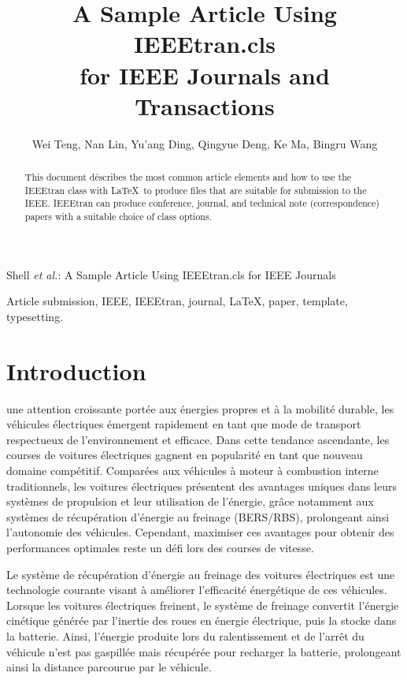 \documentclass[lettersize,journal]{IEEEtran}
\begin{document}
\title{A Sample Article Using IEEEtran.cls\\ for IEEE Journals and Transactions}

\author{Wei Teng, Nan Lin, Yu'ang Ding, Qingyue Deng, Ke Ma, Bingru Wang}

%
{Shell \MakeLowercase{\textit{et al.}}: A Sample Article Using IEEEtran.cls for IEEE Journals}

\IEEEpubid{}

\maketitle

\begin{abstract}
This document déscribes the most common article elements and how to use the IEEEtran class with \LaTeX \ to produce files that are suitable for submission to the IEEE.  IEEEtran can produce conference, journal, and technical note (correspondence) papers with a suitable choice of class options. 
\end{abstract}

\begin{IEEEkeywords}
Article submission, IEEE, IEEEtran, journal, \LaTeX, paper, template, typesetting.
\end{IEEEkeywords}

\section{Introduction}
 une attention croissante portée aux énergies propres et à la mobilité durable, les véhicules électriques émergent rapidement en tant que mode de transport respectueux de l'environnement et efficace. Dans cette tendance ascendante, les courses de voitures électriques gagnent en popularité en tant que nouveau domaine compétitif. Comparées aux véhicules à moteur à combustion interne traditionnels, les voitures électriques présentent des avantages uniques dans leurs systèmes de propulsion et leur utilisation de l'énergie, grâce notamment aux systèmes de récupération d'énergie au freinage (BERS/RBS), prolongeant ainsi l'autonomie des véhicules. Cependant, maximiser ces avantages pour obtenir des performances optimales reste un défi lors des courses de vitesse.\par
Le système de récupération d'énergie au freinage des voitures électriques est une technologie courante visant à améliorer l'efficacité énergétique de ces véhicules. Lorsque les voitures électriques freinent, le système de freinage convertit l'énergie cinétique générée par l'inertie des roues en énergie électrique, puis la stocke dans la batterie. Ainsi, l'énergie produite lors du ralentissement et de l'arrêt du véhicule n'est pas gaspillée mais récupérée pour recharger la batterie, prolongeant ainsi la distance parcourue par le véhicule.\par
\end{document}
